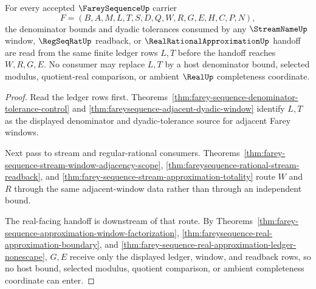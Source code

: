 \begin{theorem}
\label{thm:fareysequence-denominator-ledger}
For every accepted $\FareySequenceUp$ carrier
$$
F=(B,A,M,L,T,S,D,Q,W,R,G,E,H,C,P,N),
$$
the denominator bounds and dyadic tolerances consumed by any $\StreamNameUp$ window, $\RegSeqRatUp$ readback, or $\RealRationalApproximationUp$ handoff are read from the same finite ledger rows $L,T$ before the handoff reaches $W,R,G,E$. No consumer may replace $L,T$ by a host denominator bound, selected modulus, quotient-real comparison, or ambient $\RealUp$ completeness coordinate.
\end{theorem}
\begin{proof}
Read the ledger rows first. Theorems~\ref{thm:farey-sequence-denominator-tolerance-control} and \ref{thm:fareysequence-adjacent-dyadic-window} identify $L,T$ as the displayed denominator and dyadic-tolerance source for adjacent Farey windows.

Next pass to stream and regular-rational consumers. Theorems~\ref{thm:farey-sequence-stream-window-adjacency-scope}, \ref{thm:fareysequence-rational-stream-readback}, and \ref{thm:farey-sequence-stream-approximation-totality} route $W$ and $R$ through the same adjacent-window data rather than through an independent bound.

The real-facing handoff is downstream of that route. By Theorems~\ref{thm:farey-sequence-approximation-window-factorization}, \ref{thm:fareysequence-real-approximation-boundary}, and \ref{thm:farey-sequence-real-approximation-ledger-nonescape}, $G,E$ receive only the displayed ledger, window, and readback rows, so no host bound, selected modulus, quotient comparison, or ambient completeness coordinate can enter.
\end{proof}

